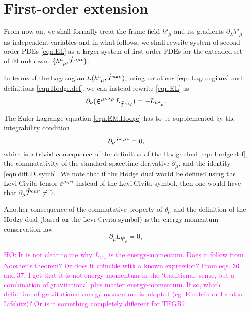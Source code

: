 \documentclass[
10pt, %
a4paper, %
oneside, %
headinclude,footinclude, %
BCOR5mm, %
]{scrartcl}
\newcommand{\IP}[1]{{\color{Red}[IP:\ \ #1]}}
\newcommand{\pd}[1]{\partial_{#1}}
\newcommand{\tetrsymbol}{h}
\newcommand{\tetr}[2]{\tetrsymbol^{#1}_{\phantom{#1}#2}}
\newcommand{\D}[1]{\partial_{#1}} %
\newcommand{\Laghodge}{L}%
\newcommand{\LCsymb}{\bm{\in}}    %
\newcommand{\LCtens}{\varepsilon} %
\newcommand{\HDT}[1]{\accentset{\star}{T}^{#1}}
\newcommand{\ho}[1]{\textcolor{magenta}{HO: #1}}
\begin{document}
\section{First-order extension}\label{sec.PDEs}

From now on, we shall formally treat the frame field $ \tetr{a}{\mu} $ and its gradients $ 
\pd{\lambda}\tetr{a}{\mu} $ as independent variables and in what follows, we shall rewrite system 
of second-order PDEs \eqref{eqn.EL} as a larger system of first-order PDEs for the extended set of 
40 unknowns $ \{ \tetr{a}{\mu},\HDT{a\mu\nu}\} $.


In terms of the Lagrangian $ \Laghodge(\tetr{a}{\mu},\HDT{a\mu\nu}) $, using notations 
\eqref{eqn.Lagrangians} and definitions 
\eqref{eqn.Hodge.def}, we can instead
rewrite \eqref{eqn.EL} as
\begin{equation}\label{eqn.EM.Hodge}
\D{\nu}(\LCsymb^{\mu\nu\lambda\rho}\Laghodge_{\HDT{a\lambda\rho}}) 
=-\Laghodge_{\tetr{a}{\mu}}.
\end{equation}

The Euler-Lagrange equation \eqref{eqn.EM.Hodge} has to be supplemented by the integrability 
condition
\begin{equation}\label{integr.HT}
\D{\nu}\HDT{a\mu\nu} = 0,
\end{equation}
which is a trivial consequence of the definition of the  Hodge dual \eqref{eqn.Hodge.def}, the 
commutativity of the standard spacetime derivative $ \D{\mu} $, and the 
identity \eqref{eqn.diff.LCsymb}.
We note that if the Hodge dual would be defined using the Levi-Civita tensor $ 
\LCtens^{\mu\nu\rho\sigma} $ instead of the Levi-Civita symbol, then one would 
have that $ \D{\mu}\HDT{a\mu\nu} \neq 0 $.

Another consequence of the commutative property of $ \pd{\mu} $ and the definition of the Hodge 
dual (based on the Levi-Civita symbol) is the energy-momentum
conservation law
\begin{equation}\label{eqn.EM}
\D{\mu}\Laghodge_{\tetr{a}{\mu}} = 0,
\end{equation}

 \ho{It is not clear to me why $ \Laghodge_{\tetr{a}{\mu}} $ is the energy-momentum.
 Does it follow from Noether's theorem? Or does it coincide with
 a known expression? From eqs. 36 and 37,
 I get that it is not energy-momentum
 in the `traditional' sense, but a combination of gravitational plus matter
 energy-momentum. If so, which definition of gravitational
 energy-momentum is adopted (eg. Einstein or Landou-Lifshitz)?
 Or is it something completely different for TEGR?}
\end{document}
